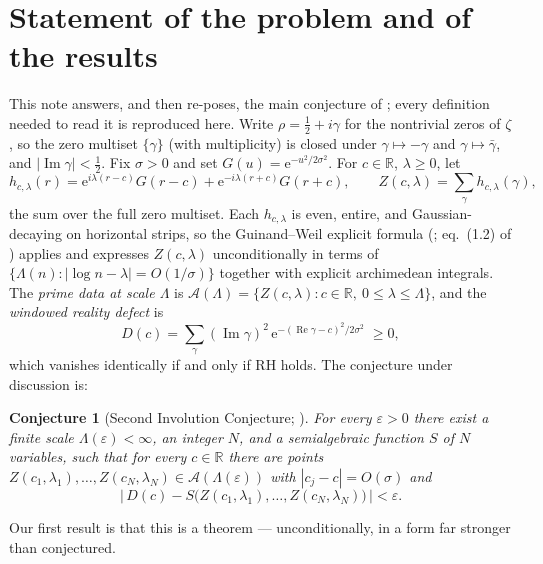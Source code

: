 \documentclass[11pt]{amsart}
\newtheorem{conjecture}[theorem]{Conjecture}
\theoremstyle{definition}
\theoremstyle{remark}
\newcommand{\RR}{\mathbb{R}}
\newcommand{\eE}{\mathrm{e}}
\DeclareMathOperator{\Rre}{Re}
\DeclareMathOperator{\Iim}{Im}
\begin{document}
\section{Statement of the problem and of the results}\label{sec:intro}

This note answers, and then re-poses, the main conjecture of \cite{SI}; every definition needed to read it is reproduced here. Write $\rho=\tfrac12+i\gamma$ for the nontrivial zeros of $\zeta$, so the zero multiset $\{\gamma\}$ (with multiplicity) is closed under $\gamma\mapsto-\gamma$ and $\gamma\mapsto\bar\gamma$, and $|\Iim\gamma|<\tfrac12$. Fix $\sigma>0$ and set $G(u)=\eE^{-u^2/2\sigma^2}$. For $c\in\RR$, $\lambda\ge0$, let
\begin{equation}\label{eq:h}
h_{c,\lambda}(r)=\eE^{i\lambda(r-c)}G(r-c)+\eE^{-i\lambda(r+c)}G(r+c),
\qquad
Z(c,\lambda)=\sum_\gamma h_{c,\lambda}(\gamma),
\end{equation}
the sum over the full zero multiset. Each $h_{c,\lambda}$ is even, entire, and Gaussian-decaying on horizontal strips, so the Guinand--Weil explicit formula (\cite[Thm.~5.12]{IwaniecKowalski}; eq.~(1.2) of \cite{SI}) applies and expresses $Z(c,\lambda)$ unconditionally in terms of $\{\Lambda(n):|\log n-\lambda|=O(1/\sigma)\}$ together with explicit archimedean integrals. The \emph{prime data at scale $\Lambda$} is $\mathcal A(\Lambda)=\{Z(c,\lambda):c\in\RR,\ 0\le\lambda\le\Lambda\}$, and the \emph{windowed reality defect} is
\begin{equation}\label{eq:defect}
D(c)=\sum_\gamma(\Iim\gamma)^2\,\eE^{-(\Rre\gamma-c)^2/2\sigma^2}\;\ge0,
\end{equation}
which vanishes identically if and only if RH holds. The conjecture under discussion is:

\begin{conjecture}[{Second Involution Conjecture; \cite[Conj.~6.1]{SI}}]\label{conj:main}
For every $\varepsilon>0$ there exist a finite scale $\Lambda(\varepsilon)<\infty$, an integer $N$, and a semialgebraic function $S$ of $N$ variables, such that for every $c\in\RR$ there are points $Z(c_1,\lambda_1),\dots,Z(c_N,\lambda_N)\in\mathcal A(\Lambda(\varepsilon))$ with $|c_j-c|=O(\sigma)$ and
\[
\big|\,D(c)-S\big(Z(c_1,\lambda_1),\dots,Z(c_N,\lambda_N)\big)\,\big|<\varepsilon.
\]
\end{conjecture}

Our first result is that this is a theorem --- unconditionally, in a form far stronger than conjectured.
\end{document}
